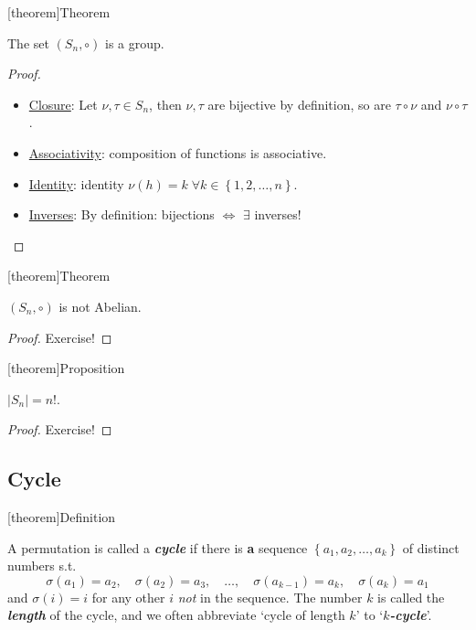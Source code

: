 \documentclass[12pt]{report}
\theoremstyle{definition}
\begin{document}
[theorem]{Theorem}
\begin{permutation is a group}
    The set $(S_n, \circ)$ is a group.
\end{permutation is a group}

\begin{proof}
    \,

    \begin{itemize}
            \item \underline{Closure}: Let $\nu, \tau \in S_n$, 
                then $\nu, \tau$ are bijective by definition,
                so are $\tau \circ \nu$ and $\nu \circ \tau$.
            \item \underline{Associativity}: composition of functions is associative.
            \item \underline{Identity}: identity $\nu (h) = k \;\forall k \in \left\{1, 2, \ldots, n\right\} $.
            \item \underline{Inverses}: By definition: bijections $\iff$ $\exists$ inverses!
    \end{itemize}
\end{proof}

[theorem]{Theorem}
\begin{permutation is not Abelian}
    $(S_n, \circ)$ is not Abelian.
\end{permutation is not Abelian}

\begin{proof}
    Exercise!
\end{proof}

[theorem]{Proposition}
\begin{order of Sn is n!}
    $|S_n| = {n!}$.
\end{order of Sn is n!}

\begin{proof}
    Exercise!
\end{proof}

\subsection{Cycle}

[theorem]{Definition}
\begin{cycles}
    A permutation is called a \textbf{\emph{cycle}} if there is \textbf{a} sequence
    $\left\{a_1, a_2, \ldots, a_k\right\} $ of distinct numbers s.t.\[
        \sigma (a_1) = a_2,\quad \sigma(a_2) = a_3,\quad \ldots,\quad \sigma (a_{k-1}) = a_k,\quad \sigma (a_k) = a_1
    \]and $\sigma (i) = i$ for any other $i$ \emph{not} in the sequence.
    The number $k$ is called the \textbf{\emph{length}} of the cycle, and we often abbreviate 
    `cycle of length $k$' to `\textbf{\emph{$k$-cycle}}'.
\end{cycles}
\end{document}
